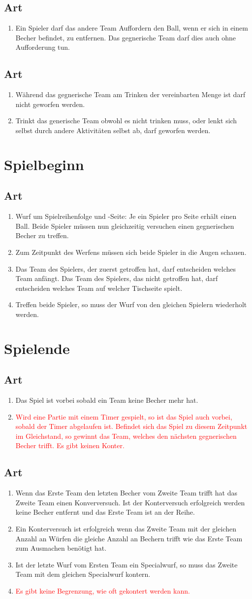 \documentclass[a4paper,11pt]{scrartcl}
\newcommand{\enum}[1]{\begin{enumerate}[label=(\arabic*)]#1\end{enumerate}}
\newcommand{\art}[2]{\subsection*{#1} \enum{#2}}
\newcommand{\new}[1]{\textcolor{red}{#1}}
\newcounter{art}
\begin{document}
\art{Art \theart}{
    \item
        Ein Spieler darf das andere Team Auffordern den Ball, wenn er sich in einem Becher befindet, zu entfernen. Das gegnerische Team darf dies auch ohne Aufforderung tun.
}

\art{Art \theart}{
    \item
        Während das gegnerische Team am Trinken der vereinbarten Menge ist darf nicht geworfen werden.
    \item
        Trinkt das generische Team obwohl es nicht trinken muss, oder lenkt sich selbst durch andere Aktivitäten selbst ab, darf geworfen werden.
}

\section{Spielbeginn}

\art{Art \theart}{
    \item
        Wurf um Spielreihenfolge und -Seite: Je ein Spieler pro Seite erhält einen Ball. Beide Spieler müssen nun gleichzeitig versuchen einen gegnerischen Becher zu treffen.
    \item
        Zum Zeitpunkt des Werfens müssen sich beide Spieler in die Augen schauen.
    \item
        Das Team des Spielers, der zuerst getroffen hat, darf entscheiden welches Team anfängt. Das Team des Spielers, das nicht getroffen hat, darf entscheiden welches Team auf welcher Tischseite spielt.
    \item
        Treffen beide Spieler, so muss der Wurf von den gleichen Spielern wiederholt werden.
}

\section{Spielende}

\art{Art \theart}{
    \item
        Das Spiel ist vorbei sobald ein Team keine Becher mehr hat.
    \item
        \new{Wird eine Partie mit einem Timer gespielt, so ist das Spiel auch vorbei, sobald der Timer abgelaufen ist. Befindet sich das Spiel zu diesem Zeitpunkt im Gleichstand, so gewinnt das Team, welches den nächsten gegnerischen Becher trifft. Es gibt keinen Konter.}
}

\art{Art \theart}{
    \item
        Wenn das Erste Team den letzten Becher vom Zweite Team trifft hat das Zweite Team einen Konverversuch. Ist der Konterversuch erfolgreich werden keine Becher entfernt und das Erste Team ist an der Reihe.
    \item
        Ein Konterversuch ist erfolgreich wenn das Zweite Team mit der gleichen Anzahl an Würfen die gleiche Anzahl an Bechern trifft wie das Erste Team zum Ausmachen benötigt hat.
    \item
        Ist der letzte Wurf vom Ersten Team ein Specialwurf, so muss das Zweite Team mit dem gleichen Specialwurf kontern.
    \item
        \new{Es gibt keine Begrenzung, wie oft gekontert werden kann.}
}
\end{document}
